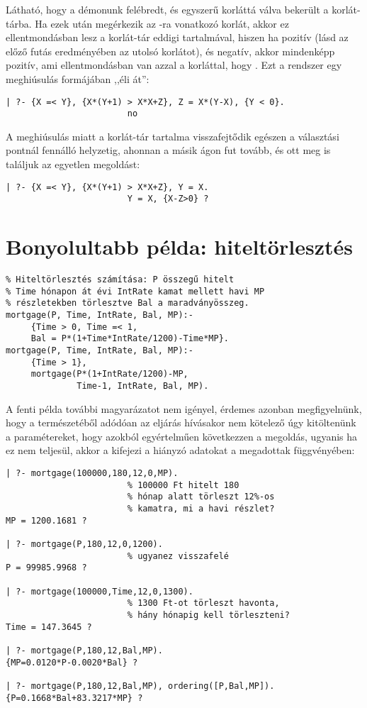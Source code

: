 Látható, hogy a démonunk felébredt, és egyszerű korláttá válva bekerült a
korlát-tárba. Ha ezek után megérkezik az -ra vonatkozó korlát, akkor
ez ellentmondásban lesz a korlát-tár eddigi tartalmával, hiszen ha 
pozitív (lásd az előző futás eredményében az utolsó korlátot), és 
negatív, akkor  mindenképp pozitív, ami ellentmondásban van azzal
a korláttal, hogy . Ezt a rendszer egy meghiúsulás formájában
,,éli át'':

\begin{verbatim}
| ?- {X =< Y}, {X*(Y+1) > X*X+Z}, Z = X*(Y-X), {Y < 0}.
                        no
\end{verbatim}

A meghiúsulás miatt a korlát-tár tartalma visszafejtődik egészen a választási
pontnál fennálló helyzetig, ahonnan a másik ágon fut tovább, és ott meg is
találjuk az egyetlen megoldást:

\begin{verbatim}
| ?- {X =< Y}, {X*(Y+1) > X*X+Z}, Y = X.
                        Y = X, {X-Z>0} ? 
\end{verbatim}

\section{Bonyolultabb \clpq példa: hiteltörlesztés}

\begin{verbatim}
% Hiteltörlesztés számítása: P összegű hitelt
% Time hónapon át évi IntRate kamat mellett havi MP
% részletekben törlesztve Bal a maradványösszeg.
mortgage(P, Time, IntRate, Bal, MP):-
     {Time > 0, Time =< 1,
     Bal = P*(1+Time*IntRate/1200)-Time*MP}.
mortgage(P, Time, IntRate, Bal, MP):-
     {Time > 1},
     mortgage(P*(1+IntRate/1200)-MP, 
              Time-1, IntRate, Bal, MP).
\end{verbatim}

A fenti \clpq példa további magyarázatot nem igényel, érdemes azonban
megfigyelnünk, hogy a \clpq természetéből adódóan az eljárás hívásakor
nem kötelező úgy kitöltenünk a paramétereket, hogy azokból egyértelműen
következzen a megoldás, ugyanis ha ez nem teljesül, akkor a \clpq
kifejezi a hiányzó adatokat a megadottak függvényében:

\begin{verbatim}
| ?- mortgage(100000,180,12,0,MP).
                        % 100000 Ft hitelt 180        
                        % hónap alatt törleszt 12%-os 
                        % kamatra, mi a havi részlet?                 
MP = 1200.1681 ? 

| ?- mortgage(P,180,12,0,1200).         
                        % ugyanez visszafelé
P = 99985.9968 ? 

| ?- mortgage(100000,Time,12,0,1300).   
                        % 1300 Ft-ot törleszt havonta,
                        % hány hónapig kell törleszteni?                      
Time = 147.3645 ? 

| ?- mortgage(P,180,12,Bal,MP). 
{MP=0.0120*P-0.0020*Bal} ? 

| ?- mortgage(P,180,12,Bal,MP), ordering([P,Bal,MP]).
{P=0.1668*Bal+83.3217*MP} ? 
\end{verbatim}

